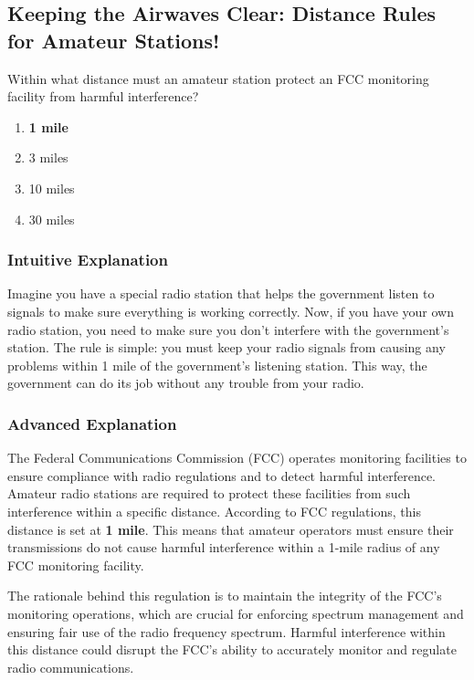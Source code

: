 \subsection{Keeping the Airwaves Clear: Distance Rules for Amateur Stations!}

\begin{tcolorbox}[colback=gray!10!white,colframe=black!75!black,title=E1B03] Within what distance must an amateur station protect an FCC monitoring facility from harmful interference?
    \begin{enumerate}[label=\Alph*,noitemsep]
        \item \textbf{1 mile}
        \item 3 miles
        \item 10 miles
        \item 30 miles
    \end{enumerate}
\end{tcolorbox}

\subsubsection{Intuitive Explanation}
Imagine you have a special radio station that helps the government listen to signals to make sure everything is working correctly. Now, if you have your own radio station, you need to make sure you don’t interfere with the government’s station. The rule is simple: you must keep your radio signals from causing any problems within 1 mile of the government’s listening station. This way, the government can do its job without any trouble from your radio.

\subsubsection{Advanced Explanation}
The Federal Communications Commission (FCC) operates monitoring facilities to ensure compliance with radio regulations and to detect harmful interference. Amateur radio stations are required to protect these facilities from such interference within a specific distance. According to FCC regulations, this distance is set at \textbf{1 mile}. This means that amateur operators must ensure their transmissions do not cause harmful interference within a 1-mile radius of any FCC monitoring facility.

The rationale behind this regulation is to maintain the integrity of the FCC's monitoring operations, which are crucial for enforcing spectrum management and ensuring fair use of the radio frequency spectrum. Harmful interference within this distance could disrupt the FCC's ability to accurately monitor and regulate radio communications.

